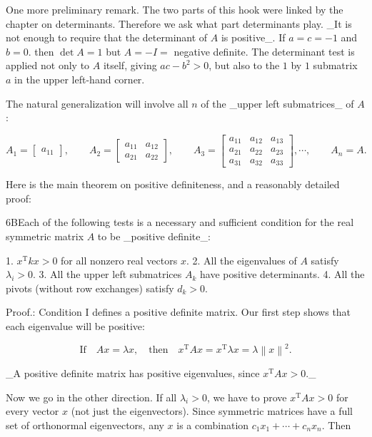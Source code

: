 One more preliminary remark. The two parts of this hook were linked by the chapter on determinants. Therefore we ask what part determinants play. _It is not enough to require that the determinant of \(A\) is positive_. If \(a=c=-1\) and \(b=0\). then \(\det A=1\) but \(A=-I=\) negative definite. The determinant test is applied not only to \(A\) itself, giving \(ac-b^{2}>0\), but also to the \(1\) by \(1\) submatrix \(a\) in the upper left-hand corner.

The natural generalization will involve all \(n\) of the _upper left submatrices_ of \(A\):

\[A_{1}=\begin{bmatrix}a_{11}\end{bmatrix},\qquad A_{2}=\begin{bmatrix}a_{11}&a _{12}\\ a_{21}&a_{22}\end{bmatrix},\qquad A_{3}=\begin{bmatrix}a_{11}&a_{12}&a_{13}\\ a_{21}&a_{22}&a_{23}\\ a_{31}&a_{32}&a_{33}\end{bmatrix},\cdots,\qquad A_{n}=A.\]

Here is the main theorem on positive definiteness, and a reasonably detailed proof:

6BEach of the following tests is a necessary and sufficient condition for the real symmetric matrix \(A\) to be _positive definite_:

1. \(x^{\mathrm{T}}kx>0\) for all nonzero real vectors \(x\).
2. All the eigenvalues of \(A\) satisfy \(\lambda_{i}>0\).
3. All the upper left submatrices \(A_{k}\) have positive determinants.
4. All the pivots (without row exchanges) satisfy \(d_{k}>0\).

Proof.: Condition I defines a positive definite matrix. Our first step shows that each eigenvalue will be positive:

\[\text{If}\quad Ax=\lambda x,\quad\text{then}\quad x^{\mathrm{T}}Ax=x^{\mathrm{ T}}\lambda x=\lambda\left\|x\right\|^{2}.\]

_A positive definite matrix has positive eigenvalues, since \(x^{\mathrm{T}}Ax>0\)._

Now we go in the other direction. If all \(\lambda_{i}>0\), we have to prove \(x^{\mathrm{T}}Ax>0\) for every vector \(x\) (not just the eigenvectors). Since symmetric matrices have a full set of orthonormal eigenvectors, any \(x\) is a combination \(c_{1}x_{1}+\cdots+c_{n}x_{n}\). Then

